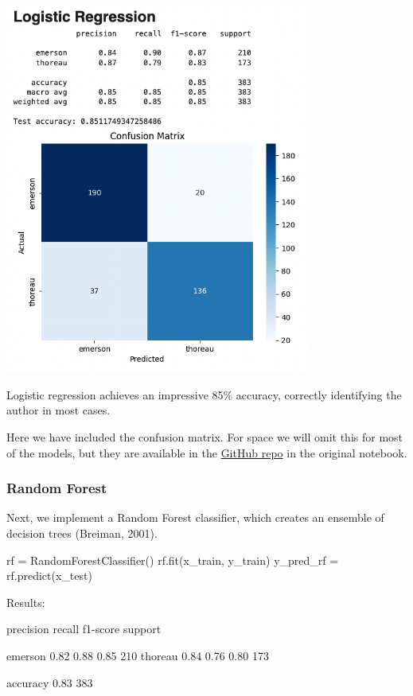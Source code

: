 \documentclass[
]{article}
\newenvironment{Shaded}{}{}
\newcommand{\NormalTok}[1]{#1}
\newcommand{\OperatorTok}[1]{\textcolor[rgb]{0.40,0.40,0.40}{#1}}
\begin{document}
\includegraphics[width=0.75\textwidth]{logistic_regression_confusion.png}

Logistic regression achieves an impressive 85\% accuracy, correctly
identifying the author in most cases.

Here we have included the confusion matrix. For space we will omit this for
most of the models, but they are available in the
\href{https://github.com/ranton256/classifying_concord/tree/main}{GitHub
repo} in the original notebook.

\subsubsection{Random Forest}\label{random-forest}

Next, we implement a Random Forest classifier, which creates an ensemble
of decision trees (Breiman, 2001).

\begin{Shaded}
\begin{Highlighting}[]
\NormalTok{rf }\OperatorTok{=}\NormalTok{ RandomForestClassifier()}
\NormalTok{rf.fit(x\_train, y\_train)}
\NormalTok{y\_pred\_rf }\OperatorTok{=}\NormalTok{ rf.predict(x\_test)}
\end{Highlighting}
\end{Shaded}

Results:

\begin{Shaded}
\begin{Highlighting}[]
\NormalTok{precision    recall  f1{-}score   support}

\NormalTok{emerson       0.82      0.88      0.85       210}
\NormalTok{thoreau       0.84      0.76      0.80       173}

\NormalTok{accuracy                          0.83       383}
\end{Highlighting}
\end{Shaded}
\end{document}
